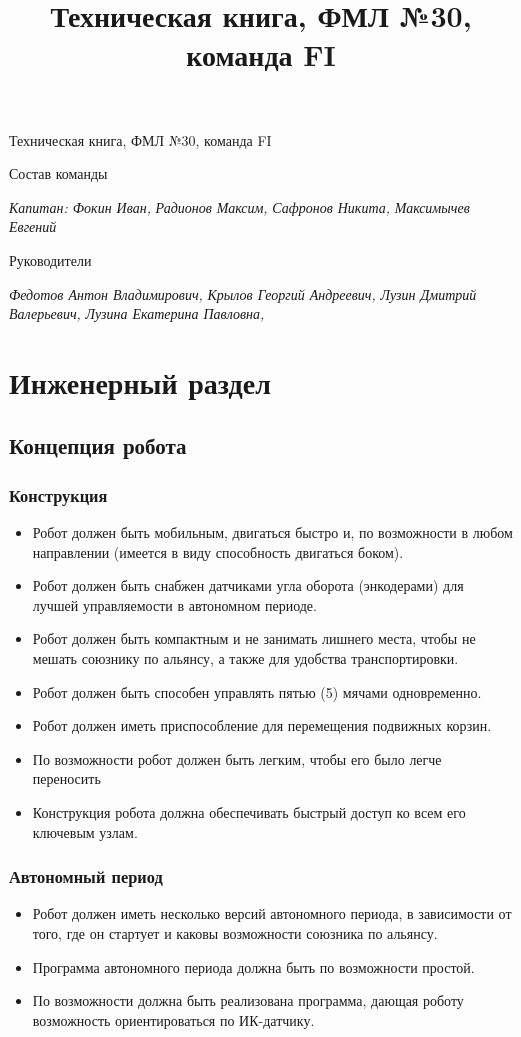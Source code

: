 \documentclass[12pt]{article}
\title{ Техническая книга, ФМЛ №30, команда FI}
\begin{document}
	\begin{center}
\large Техническая книга, ФМЛ №30, команда FI
	\end{center}
        \large Состав команды
	\begin{flushleft}
		\emph{Капитан: Фокин Иван,}
		\emph{Радионов Максим,}
		\emph{Сафронов Никита,}
		\emph{Максимычев Евгений}
	\end{flushleft}
	\large Руководители
	\begin{flushleft}
		\emph{Федотов Антон Владимирович,}
		\emph{Крылов Георгий Андреевич,}
		\emph{Лузин Дмитрий Валерьевич,}
		\emph{Лузина Екатерина Павловна,}
	\end{flushleft}		
	\newpage
	\tableofcontents{}
	\newpage
	\section{Инженерный раздел}
	\subsection{Концепция робота}
	\subsubsection{Конструкция}
	\begin{itemize}
		\item Робот должен быть мобильным, двигаться быстро и, по возможности в любом направлении (имеется в виду способность двигаться боком).
		\item Робот должен быть снабжен датчиками угла оборота (энкодерами) для лучшей управляемости в автономном периоде.
		\item Робот должен быть компактным и не занимать лишнего места, чтобы не мешать союзнику по альянсу, а также для удобства транспортировки.
		\item Робот должен быть способен управлять пятью (5) мячами одновременно.
		\item Робот должен иметь приспособление для перемещения подвижных корзин.
		\item По возможности робот должен быть легким, чтобы его было легче переносить
		\item Конструкция робота должна обеспечивать быстрый доступ ко всем его ключевым узлам.
	\end{itemize}
	\subsubsection{Автономный период}
	  \begin{itemize}
	  	\item Робот должен иметь несколько версий автономного периода, в зависимости от того, где он стартует и каковы возможности союзника по альянсу.
	  	\item Программа автономного периода должна быть по возможности простой.
	  	\item По возможности должна быть реализована программа, дающая роботу возможность ориентироваться по ИК-датчику.
	  \end{itemize}
\end{document}
